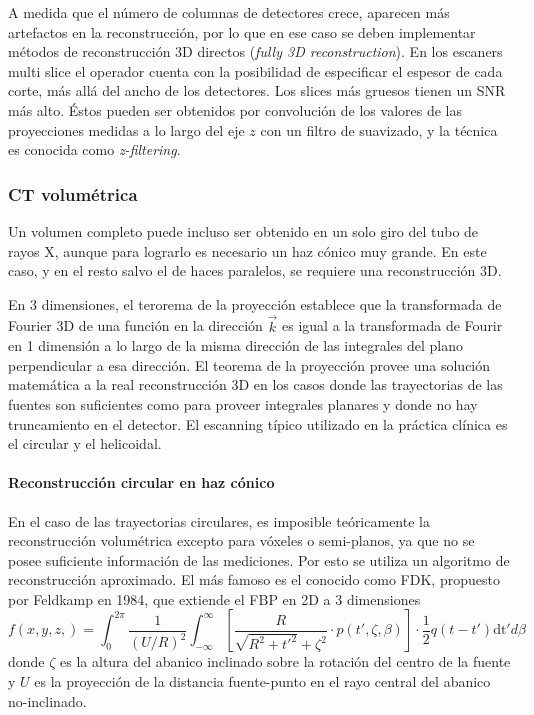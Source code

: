 A medida que el n{\'u}mero de columnas de detectores crece, aparecen m{\'a}s
artefactos en la reconstrucci{\'o}n, por lo que en ese caso se deben
implementar m{\'e}todos de reconstrucci{\'o}n 3D directos ({\emph{fully 3D
reconstruction}}). En los escaners multi slice el operador cuenta con la
posibilidad de especificar el espesor de cada corte, m{\'a}s all{\'a} del
ancho de los detectores. Los slices m{\'a}s gruesos tienen un SNR m{\'a}s
alto. {\'E}stos pueden ser obtenidos por convoluci{\'o}n de los valores de las
proyecciones medidas a lo largo del eje $z$ con un filtro de suavizado, y la
t{\'e}cnica es conocida como {\emph{z-filtering}}.

\subsubsection{CT volum{\'e}trica}

Un volumen completo puede incluso ser obtenido en un solo giro del tubo de
rayos X, aunque para lograrlo es necesario un haz c{\'o}nico muy grande. En
este caso, y en el resto salvo el de haces paralelos, se requiere una
reconstrucci{\'o}n 3D.

En 3 dimensiones, el terorema de la proyecci{\'o}n establece que la
transformada de Fourier 3D de una funci{\'o}n en la direcci{\'o}n $\vec{k}$ es
igual a la transformada de Fourir en 1 dimensi{\'o}n a lo largo de la misma
direcci{\'o}n de las integrales del plano perpendicular a esa direcci{\'o}n.
El teorema de la proyecci{\'o}n provee una soluci{\'o}n matem{\'a}tica a la
real reconstrucci{\'o}n 3D en los casos donde las trayectorias de las fuentes
son suficientes como para proveer integrales planares y donde no hay
truncamiento en el detector. El escanning t{\'i}pico utilizado en la
pr{\'a}ctica cl{\'i}nica es el circular y el helicoidal.

\paragraph{Reconstrucci{\'o}n circular en haz c{\'o}nico}

En el caso de las trayectorias circulares, es imposible te{\'o}ricamente la
reconstrucci{\'o}n volum{\'e}trica excepto para v{\'o}xeles o semi-planos, ya
que no se posee suficiente informaci{\'o}n de las mediciones. Por esto se
utiliza un algoritmo de reconstrucci{\'o}n aproximado. El m{\'a}s famoso es el
conocido como FDK, propuesto por Feldkamp en 1984, que extiende el FBP en 2D a
3 dimensiones
\[ f (x, y, z,) = \int_0^{2 \pi} \frac{1}{(U / R)^2} \int_{- \infty}^{\infty}
   \left[ \frac{R}{\sqrt{R^2 + t'^2} + \zeta^2} \cdot p (t', \zeta, \beta)
   \right] \cdot \frac{1}{2} q (t - t') \text{dt}' d \beta \]
donde $\zeta$ es la altura del abanico inclinado sobre la rotaci{\'o}n del
centro de la fuente y $U$ es la proyecci{\'o}n de la distancia fuente-punto en
el rayo central del abanico no-inclinado.

